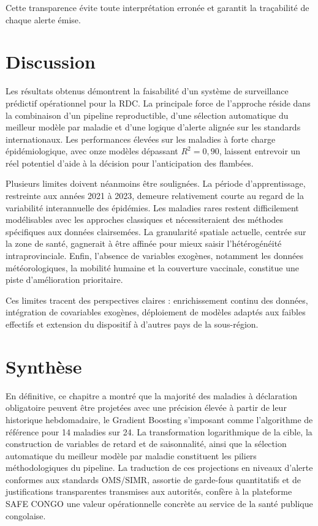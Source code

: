 Cette transparence évite toute interprétation erronée et garantit la traçabilité de
chaque alerte émise.

\section{Discussion}

Les résultats obtenus démontrent la faisabilité d'un système de surveillance
prédictif opérationnel pour la RDC. La principale force de l'approche réside dans
la combinaison d'un pipeline reproductible, d'une sélection automatique du meilleur
modèle par maladie et d'une logique d'alerte alignée sur les standards
internationaux. Les performances élevées sur les maladies à forte charge
épidémiologique, avec onze modèles dépassant $R^2 = 0{,}90$, laissent entrevoir un
réel potentiel d'aide à la décision pour l'anticipation des flambées.

Plusieurs limites doivent néanmoins être soulignées. La période d'apprentissage,
restreinte aux années 2021 à 2023, demeure relativement courte au regard de la
variabilité interannuelle des épidémies. Les maladies rares restent difficilement
modélisables avec les approches classiques et nécessiteraient des méthodes
spécifiques aux données clairsemées. La granularité spatiale actuelle, centrée sur
la zone de santé, gagnerait à être affinée pour mieux saisir l'hétérogénéité
intraprovinciale. Enfin, l'absence de variables exogènes, notamment les données
météorologiques, la mobilité humaine et la couverture vaccinale, constitue une piste
d'amélioration prioritaire.

Ces limites tracent des perspectives claires : enrichissement continu des données,
intégration de covariables exogènes, déploiement de modèles adaptés aux faibles
effectifs et extension du dispositif à d'autres pays de la sous-région.

\section{Synthèse}

En définitive, ce chapitre a montré que la majorité des maladies à déclaration
obligatoire peuvent être projetées avec une précision élevée à partir de leur
historique hebdomadaire, le Gradient Boosting s'imposant comme l'algorithme de
référence pour 14 maladies sur 24. La transformation logarithmique de la cible, la
construction de variables de retard et de saisonnalité, ainsi que la sélection
automatique du meilleur modèle par maladie constituent les piliers méthodologiques
du pipeline. La traduction de ces projections en niveaux d'alerte conformes aux
standards OMS/SIMR, assortie de garde-fous quantitatifs et de justifications
transparentes transmises aux autorités, confère à la plateforme \textsc{SAFE CONGO}
une valeur opérationnelle concrète au service de la santé publique congolaise.
